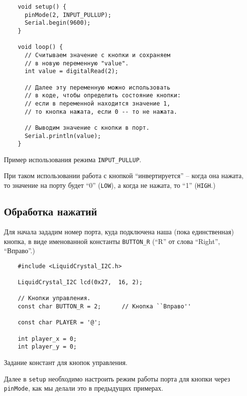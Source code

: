 \documentclass[../sparc.tex]{subfiles}
\begin{document}
\begin{listing}[H]
  \begin{verbatim}
    void setup() {
      pinMode(2, INPUT_PULLUP);
      Serial.begin(9600);
    }

    void loop() {
      // Считываем значение с кнопки и сохраняем
      // в новую переменную "value".
      int value = digitalRead(2);

      // Далее эту переменную можно использовать
      // в коде, чтобы определить состояние кнопки:
      // если в переменной находится значение 1,
      // то кнопка нажата, если 0 -- то не нажата.

      // Выводим значение с кнопки в порт.
      Serial.println(value);
    }
  \end{verbatim}
  \caption{Пример использования режима \texttt{INPUT\_PULLUP}.}
  \label{listing:game-dev-input-pullup-example}
\end{listing}

При таком использовании работа с кнопкой ``инвертируется'' -- когда она нажата,
то значение на порту будет ``0'' (\texttt{LOW}), а когда не нажата, то ``1''
(\texttt{HIGH}.)

\subsection{Обработка нажатий}

Для начала зададим номер порта, куда подключена наша (пока единственная) кнопка,
в виде именованной константы \texttt{BUTTON\_R} (``R'' от слова ``Right'',
``Вправо''.)

\begin{listing}[H]
  \begin{verbatim}
    #include <LiquidCrystal_I2C.h>

    LiquidCrystal_I2C lcd(0x27,  16, 2);

    // Кнопки управления.
    const char BUTTON_R = 2;      // Кнопка ``Вправо''

    const char PLAYER = '@';

    int player_x = 0;
    int player_y = 0;
  \end{verbatim}
  \caption{Задание констант для кнопок управления.}
  \label{listing:game-dev-button-constants}
\end{listing}

Далее в \texttt{setup} необходимо настроить режим работы порта для кнопки через
\texttt{pinMode}, как мы делали это в предыдущих примерах.
\end{document}
